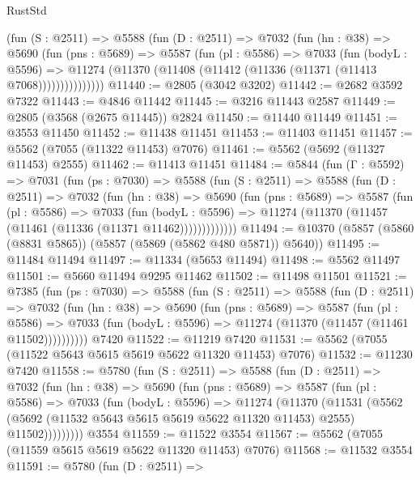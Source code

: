 \begin{lexlean}{RustStd}
\begin{coremodule}
          (fun (S : @2511) =>
          @5588
            (fun (D : @2511) =>
            @7032
              (fun (hn : @38) =>
              @5690
                (fun (pns : @5689) =>
                @5587
                  (fun (pl : @5586) =>
                  @7033
                    (fun (bodyL : @5596) =>
                    @11274 (@11370 (@11408 (@11412 (@11336 (@11371 (@11413 @7068)))))))))))))))
@11440 := @2805 (@3042 @3202)
@11442 := @2682 @3592 @7322
@11443 := @4846 @11442
@11445 := @3216 @11443 @2587
@11449 := @2805 (@3568 (@2675 @11445)) @2824
@11450 := @11440 @11449
@11451 := @3553 @11450
@11452 := @11438 @11451
@11453 := @11403 @11451
@11457 := @5562 (@7055 (@11322 @11453) @7076)
@11461 := @5562 (@5692 (@11327 @11453) @2555)
@11462 := @11413 @11451
@11484 := @5844
    (fun (Γ : @5592) =>
    @7031
      (fun (ps : @7030) =>
      @5588
        (fun (S : @2511) =>
        @5588
          (fun (D : @2511) =>
          @7032
            (fun (hn : @38) =>
            @5690
              (fun (pns : @5689) =>
              @5587
                (fun (pl : @5586) =>
                @7033
                  (fun (bodyL : @5596) =>
                  @11274 (@11370 (@11457 (@11461 (@11336 (@11371 @11462)))))))))))))
@11494 := @10370 (@5857 (@5860 (@8831 @5865)) (@5857 (@5869 (@5862 @480 @5871)) @5640))
@11495 := @11484 @11494
@11497 := @11334 (@5653 @11494)
@11498 := @5562 @11497
@11501 := @5660 @11494 @9295 @11462
@11502 := @11498 @11501
@11521 := @7385
    (fun (ps : @7030) =>
    @5588
      (fun (S : @2511) =>
      @5588
        (fun (D : @2511) =>
        @7032
          (fun (hn : @38) =>
          @5690
            (fun (pns : @5689) =>
            @5587
              (fun (pl : @5586) =>
              @7033 (fun (bodyL : @5596) => @11274 (@11370 (@11457 (@11461 @11502))))))))))
    @7420
@11522 := @11219 @7420
@11531 := @5562 (@7055 (@11522 @5643 @5615 @5619 @5622 @11320 @11453) @7076)
@11532 := @11230 @7420
@11558 := @5780
    (fun (S : @2511) =>
    @5588
      (fun (D : @2511) =>
      @7032
        (fun (hn : @38) =>
        @5690
          (fun (pns : @5689) =>
          @5587
            (fun (pl : @5586) =>
            @7033
              (fun (bodyL : @5596) =>
              @11274
                (@11370
                  (@11531
                    (@5562
                      (@5692 (@11532 @5643 @5615 @5619 @5622 @11320 @11453) @2555)
                      @11502)))))))))
    @3554
@11559 := @11522 @3554
@11567 := @5562 (@7055 (@11559 @5615 @5619 @5622 @11320 @11453) @7076)
@11568 := @11532 @3554
@11591 := @5780
    (fun (D : @2511) =>

\end{coremodule}
\end{lexlean}
